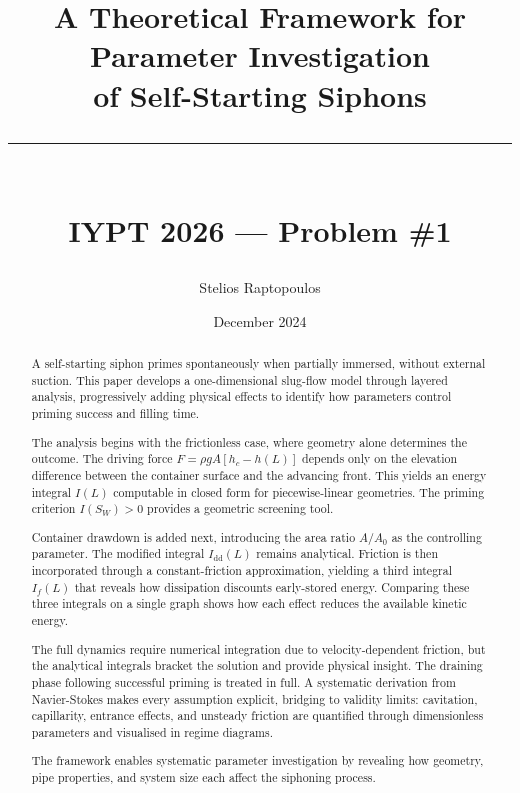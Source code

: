 \documentclass[11pt]{article}
\title{A Theoretical Framework for Parameter Investigation\\
       of Self-Starting Siphons\\[0.75em]
       \rule{0.7\textwidth}{0.4pt}\\[0.75em]
       \large IYPT 2026 --- Problem \#1}
\author{Stelios Raptopoulos}
\date{December 2024}
\begin{document}
\maketitle

\begin{abstract}
A self-starting siphon primes spontaneously when partially immersed, without external suction. This paper develops a one-dimensional slug-flow model through layered analysis, progressively adding physical effects to identify how parameters control priming success and filling time.

The analysis begins with the frictionless case, where geometry alone determines the outcome. The driving force $F = \rho g A [h_c - h(L)]$ depends only on the elevation difference between the container surface and the advancing front. This yields an energy integral $I(L)$ computable in closed form for piecewise-linear geometries. The priming criterion $I(S_W) > 0$ provides a geometric screening tool.

Container drawdown is added next, introducing the area ratio $A/A_0$ as the controlling parameter. The modified integral $I_{\text{dd}}(L)$ remains analytical. Friction is then incorporated through a constant-friction approximation, yielding a third integral $I_f(L)$ that reveals how dissipation discounts early-stored energy. Comparing these three integrals on a single graph shows how each effect reduces the available kinetic energy.

The full dynamics require numerical integration due to velocity-dependent friction, but the analytical integrals bracket the solution and provide physical insight. The draining phase following successful priming is treated in full. A systematic derivation from Navier-Stokes makes every assumption explicit, bridging to validity limits: cavitation, capillarity, entrance effects, and unsteady friction are quantified through dimensionless parameters and visualised in regime diagrams.

The framework enables systematic parameter investigation by revealing how geometry, pipe properties, and system size each affect the siphoning process.
\end{abstract}

\tableofcontents
\newpage

\end{document}
